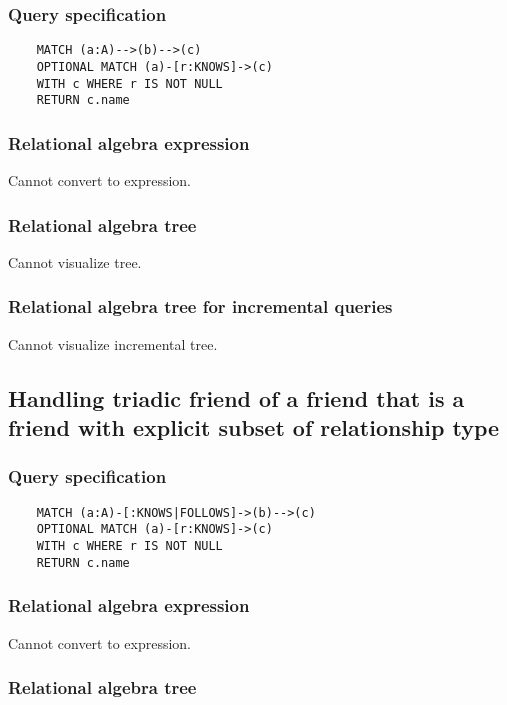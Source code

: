	\subsubsection*{Query specification}

	\begin{lstlisting}
	MATCH (a:A)-->(b)-->(c)
	OPTIONAL MATCH (a)-[r:KNOWS]->(c)
	WITH c WHERE r IS NOT NULL
	RETURN c.name
	\end{lstlisting}


	\subsubsection*{Relational algebra expression}

	Cannot convert to expression.

	\subsubsection*{Relational algebra tree}

	Cannot visualize tree.

	\subsubsection*{Relational algebra tree for incremental queries}

	Cannot visualize incremental tree.
	\subsection{Handling triadic friend of a friend that is a friend with explicit subset of relationship type}

	\subsubsection*{Query specification}

	\begin{lstlisting}
	MATCH (a:A)-[:KNOWS|FOLLOWS]->(b)-->(c)
	OPTIONAL MATCH (a)-[r:KNOWS]->(c)
	WITH c WHERE r IS NOT NULL
	RETURN c.name
	\end{lstlisting}


	\subsubsection*{Relational algebra expression}

	Cannot convert to expression.

	\subsubsection*{Relational algebra tree}

